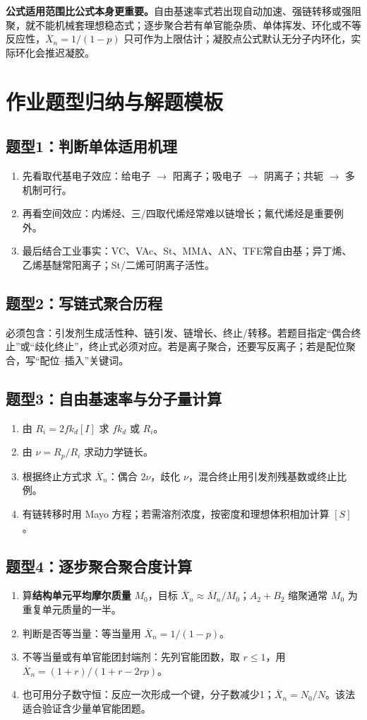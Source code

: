 \documentclass[UTF8,a4paper,10pt,twocolumn]{ctexart}
\newcommand{\Mn}{\overline{M}_n}
\newcommand{\Xn}{\overline{X}_n}
\newcommand{\kd}{k_d}
\newcommand{\Rp}{R_p}
\newcommand{\Ri}{R_i}
\begin{document}
\begin{pitfall}
  \textbf{公式适用范围比公式本身更重要。}自由基速率式若出现自动加速、强链转移或强阻聚，就不能机械套理想稳态式；逐步聚合若有单官能杂质、单体挥发、环化或不等反应性，$\Xn=1/(1-p)$ 只可作为上限估计；凝胶点公式默认无分子内环化，实际环化会推迟凝胶。
\end{pitfall}

\section{作业题型归纳与解题模板}
\subsection{题型1：判断单体适用机理}
\begin{enumerate}
  \item 先看取代基电子效应：给电子 $\to$ 阳离子；吸电子 $\to$ 阴离子；共轭 $\to$ 多机制可行。
  \item 再看空间效应：内烯烃、三/四取代烯烃常难以链增长；氟代烯烃是重要例外。
  \item 最后结合工业事实：VC、VAc、St、MMA、AN、TFE常自由基；异丁烯、乙烯基醚常阳离子；St/二烯可阴离子活性。
\end{enumerate}

\subsection{题型2：写链式聚合历程}
必须包含：引发剂生成活性种、链引发、链增长、终止/转移。若题目指定“偶合终止”或“歧化终止”，终止式必须对应。若是离子聚合，还要写反离子；若是配位聚合，写“配位--插入”关键词。

\subsection{题型3：自由基速率与分子量计算}
\begin{enumerate}
  \item 由 $\Ri=2f\kd[I]$ 求 $f\kd$ 或 $\Ri$。
  \item 由 $\nu=\Rp/\Ri$ 求动力学链长。
  \item 根据终止方式求 $\Xn$：偶合 $2\nu$，歧化 $\nu$，混合终止用引发剂残基数或终止比例。
  \item 有链转移时用 Mayo 方程；若需溶剂浓度，按密度和理想体积相加计算 $[S]$。
\end{enumerate}

\subsection{题型4：逐步聚合聚合度计算}
\begin{enumerate}
  \item 算\textbf{结构单元平均摩尔质量} $M_0$，目标 $\Xn\approx\Mn/M_0$；$A_2+B_2$ 缩聚通常 $M_0$ 为重复单元质量的一半。
  \item 判断是否等当量：等当量用 $\Xn=1/(1-p)$。
  \item 不等当量或有单官能团封端剂：先列官能团数，取 $r\le1$，用 $\Xn=(1+r)/(1+r-2rp)$。
  \item 也可用分子数守恒：反应一次形成一个键，分子数减少1；$\Xn=N_0/N$。该法适合验证含少量单官能团题。
\end{enumerate}
\end{document}
